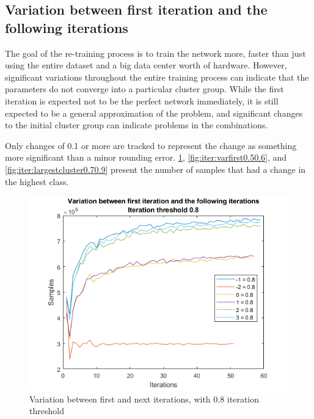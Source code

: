 \subsection{Variation between first iteration and the following iterations}

The goal of the re-training process is to train the network more, faster than just using the entire dataset and a big data center worth of hardware.
However, significant variations throughout the entire training process can indicate that the parameters do not converge into a particular cluster group.
While the first iteration is expected not to be the perfect network immediately, it is still expected to be a general approximation of the problem, and significant changes to the initial cluster group can indicate problems in the combinations.

Only changes of 0.1 or more are tracked to represent the change as something more significant than a minor rounding error. 
\cref{fig:iter:varfirst0.8}, \cref{fig:iter:varfirst0.50.6}, and \cref{fig:iter:largestcluster0.70.9} present the number of samples that had a change in the highest class.


\begin{figure}  %
  \centering
  \includegraphics[width=.7\textwidth]{figures/varfirst-0.8.png}
  \caption{Variation between first and next iterations, with 0.8 iteration threshold}
  \label{fig:iter:varfirst0.8}
\end{figure}

